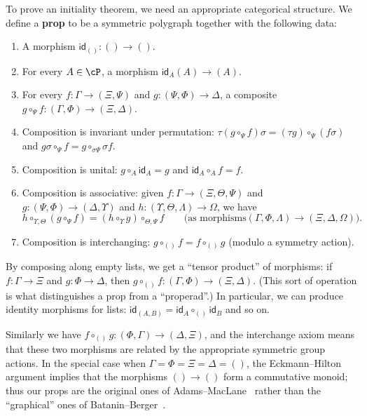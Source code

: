 \documentclass{book}
\def\idfunc{\mathsf{id}}
\begin{document}
To prove an initiality theorem, we need an appropriate categorical structure.
We define a \textbf{prop} to be a symmetric polygraph \cP together with the following data:
\begin{enumerate}
\item A morphism $\idfunc_{()}:()\to ()$.
\item For every $A\in\cP$, a morphism $\idfunc_A (A)\to (A)$.
\item For every $f:\Gamma\to (\Xi,\Psi)$ and $g:(\Psi,\Phi)\to \Delta$, a composite $g\circ_\Psi f : (\Gamma,\Phi) \to (\Xi,\Delta)$.
\item Composition is invariant under permutation: $\tau(g\circ_\Psi f)\sigma = (\tau g)\circ_\Psi (f\sigma)$ and $g\sigma \circ_\Psi f = g\circ_{\sigma \Psi} \sigma f$.
\item Composition is unital:
  $g\circ_A \idfunc_A = g$ and $\idfunc_A\circ_A f = f$.
\item Composition is associative: given $f:\Gamma\to (\Xi,\Theta,\Psi)$ and $g:(\Psi,\Phi)\to (\Delta,\Upsilon)$ and $h:(\Upsilon,\Theta,\Lambda)\to \Omega$, we have
  \[h \circ_{\Upsilon,\Theta} (g\circ_\Psi f) = (h\circ_\Upsilon g) \circ_{\Theta,\Psi} f \qquad \text{(as morphisms} (\Gamma,\Phi,\Lambda) \to (\Xi,\Delta,\Omega)). \]
\item Composition is interchanging: $g\circ_{()}f = f\circ_{()}g$ (modulo a symmetry action).
\end{enumerate}
By composing along empty lists, we get a ``tensor product'' of morphisms: if $f:\Gamma\to\Xi$ and $g:\Phi\to\Delta$, then $g\circ_{()}f : (\Gamma,\Phi) \to (\Xi,\Delta)$.
(This sort of operation is what distinguishes a prop from a ``properad''.)
In particular, we can produce identity morphisms for lists: $\idfunc_{(A,B)} = \idfunc_A \circ_{()} \idfunc_B$ and so on.

Similarly we have $f\circ_{()}g : (\Phi,\Gamma) \to (\Delta,\Xi)$, and the interchange axiom means that these two morphisms are related by the appropriate symmetric group actions.
In the special case when $\Gamma=\Phi=\Xi=\Delta=()$, the Eckmann--Hilton argument implies that the morphisms $()\to ()$ form a commutative monoid; thus our props are the original ones of Adams--MacLane~\cite{maclane:natural-assoc,maclane:cat-alg} rather than the ``graphical'' ones of Batanin--Berger~\cite{bb:htapm}.
\end{document}
